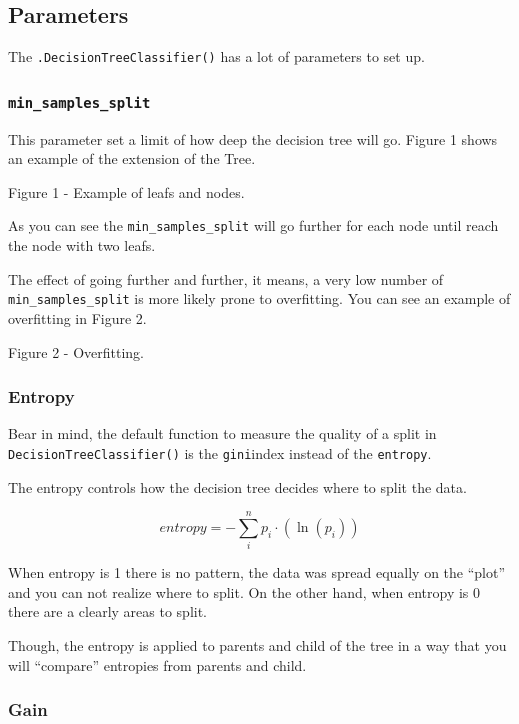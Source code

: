 \documentclass[]{book}
\begin{document}
\subsection{Parameters}\label{parameters-2}

The \texttt{.DecisionTreeClassifier()} has a lot of parameters to set
up.

\subsubsection{\texorpdfstring{\texttt{min\_samples\_split}}{min\_samples\_split}}\label{min_samples_split-1}

This parameter set a limit of how deep the decision tree will go. Figure
1 shows an example of the extension of the Tree.

Figure 1 - Example of leafs and nodes.

As you can see the \texttt{min\_samples\_split} will go further for each
node until reach the node with two leafs.

The effect of going further and further, it means, a very low number of
\texttt{min\_samples\_split} is more likely prone to overfitting. You
can see an example of overfitting in Figure 2.

Figure 2 - Overfitting.

\subsubsection{Entropy}\label{entropy-1}

Bear in mind, the default function to measure the quality of a split in
\texttt{DecisionTreeClassifier()} is the \texttt{gini}index instead of
the \texttt{entropy}.

The entropy controls how the decision tree decides where to split the
data.

\[entropy = - \sum_i^n p_i \cdot (\ln(p_i))\]

When entropy is 1 there is no pattern, the data was spread equally on
the ``plot'' and you can not realize where to split. On the other hand,
when entropy is 0 there are a clearly areas to split.

Though, the entropy is applied to parents and child of the tree in a way
that you will ``compare'' entropies from parents and child.

\subsubsection{Gain}\label{gain-1}
\end{document}
